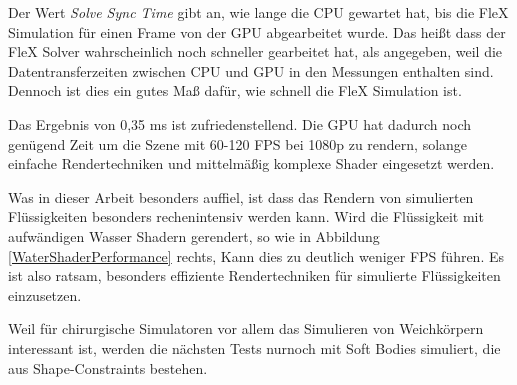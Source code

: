 Der Wert \textit{Solve Sync Time} gibt an, wie lange die CPU gewartet hat, bis die FleX Simulation für einen Frame von der GPU abgearbeitet wurde. Das heißt dass der FleX Solver wahrscheinlich noch schneller gearbeitet hat, als angegeben, weil die Datentransferzeiten zwischen CPU und GPU in den Messungen enthalten sind. Dennoch ist dies ein gutes Maß dafür, wie schnell die FleX Simulation ist.

Das Ergebnis von 0,35 ms ist zufriedenstellend. Die GPU hat dadurch noch genügend Zeit um die Szene mit 60-120 \ac{FPS} bei 1080p zu rendern, solange einfache Rendertechniken und mittelmäßig komplexe Shader eingesetzt werden. 

Was in dieser Arbeit besonders auffiel, ist dass das Rendern von simulierten Flüssigkeiten besonders rechenintensiv werden kann. Wird die Flüssigkeit mit aufwändigen Wasser Shadern gerendert, so wie in Abbildung \ref{WaterShaderPerformance} rechts, Kann dies zu deutlich weniger \ac{FPS} führen. Es ist also ratsam, besonders effiziente Rendertechniken für simulierte Flüssigkeiten einzusetzen.

Weil für chirurgische Simulatoren vor allem das Simulieren von Weichkörpern interessant ist, werden die nächsten Tests nurnoch mit Soft Bodies simuliert, die aus Shape-Constraints bestehen.


